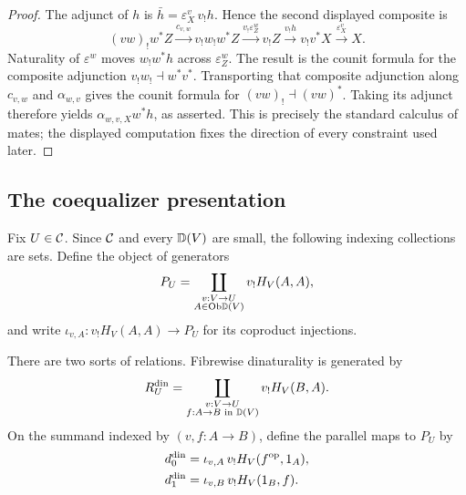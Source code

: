 \begin{proof}
The adjunct of \(h\) is
\(\bar h=\varepsilon^v_X\,v_!h\).  Hence the second displayed composite is
\[
  (vw)_!w^*Z
  \xrightarrow{c_{v,w}}v_!w_!w^*Z
  \xrightarrow{v_!\varepsilon^w_Z}v_!Z
  \xrightarrow{v_!h}v_!v^*X
  \xrightarrow{\varepsilon^v_X}X.
\]
Naturality of \(\varepsilon^w\) moves \(w_!w^*h\) across
\(\varepsilon^w_Z\).  The result is the counit formula for the composite
adjunction \(v_!w_!\dashv w^*v^*\).  Transporting that composite adjunction
along \(c_{v,w}\) and \(\alpha_{w,v}\) gives the counit formula for
\((vw)_!\dashv(vw)^*\).  Taking its adjunct therefore yields
\(\alpha_{w,v,X}w^*h\), as asserted.  This is precisely the standard
calculus of mates; the displayed computation fixes the direction of every
constraint used later.
\end{proof}

\subsection{The coequalizer presentation}

Fix \(U\in\mathcal{C}\).  Since \(\mathcal{C}\) and every \(\mathbb{D}(V)\) are small, the following
indexing collections are sets.  Define the object of generators
\begin{equation}
  P_U=\coprod_{\substack{v:V\to U\\A\in\mathrm{Ob}\mathbb{D}(V)}}
      v_!H_V(A,A),
  \label{eq:PU}
\end{equation}
and write
\(\iota_{v,A}:v_!H_V(A,A)\to P_U\) for its coproduct injections.

There are two sorts of relations.  Fibrewise dinaturality is generated by
\begin{equation}
  R_U^{\mathrm{din}}=
  \coprod_{\substack{v:V\to U\\f:A\to B\text{ in }\mathbb{D}(V)}}
      v_!H_V(B,A).
  \label{eq:Rdin}
\end{equation}
On the summand indexed by \((v,f:A\to B)\), define the parallel maps to
\(P_U\) by
\begin{align}
  d^{\mathrm{din}}_0
  &=\iota_{v,A}\,v_!H_V(f^{\mathrm{op}},1_A),
  \\
  d^{\mathrm{din}}_1
  &=\iota_{v,B}\,v_!H_V(1_B,f).
  \label{eq:din-relation-maps}
\end{align}

